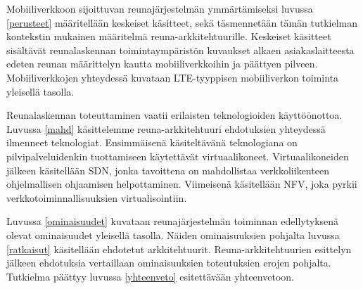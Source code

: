 Mobiiliverkkoon sijoittuvan reunajärjestelmän ymmärtämiseksi luvussa \ref{perusteet} määritellään keskeiset käsitteet, sekä täsmennetään tämän tutkielman kontekstin mukainen määritelmä reuna-arkkitehtuurille.
Keskeiset käsitteet sisältävät reunalaskennan toimintaympäristön kuvaukset alkaen asiakaslaitteesta edeten reunan määrittelyn kautta mobiiliverkkoihin ja päättyen pilveen.
Mobiiliverkkojen yhteydessä kuvataan LTE-tyyppisen mobiiliverkon toiminta yleisellä tasolla.

Reunalaskennan toteuttaminen vaatii erilaisten teknologioiden käyttöönottoa. Luvussa \ref{mahd} käsittelemme reuna-arkkitehtuuri ehdotuksien yhteydessä ilmenneet teknologiat. Ensimmäisenä käsiteltävänä teknologiana on pilvipalveluidenkin tuottamiseen käytettävät virtuaalikoneet.
Virtuaalikoneiden jälkeen käsitellään SDN, jonka tavoittena on mahdollistaa verkkoliikenteen ohjelmallisen ohjaamisen helpottaminen. 
Viimeisenä käsitellään NFV, joka pyrkii verkkotoiminnallisuuksien virtualisointiin.

 Luvussa \ref{ominaisuudet} kuvataan reunajärjestelmän toiminnan edellytyksenä olevat ominaisuudet yleisellä tasolla. 
Näiden ominaisuuksien pohjalta luvussa \ref{ratkaisut} käsitellään ehdotetut arkkitehtuurit. 
Reuna-arkkitehtuurien esittelyn jälkeen ehdotuksia vertaillaan ominaisuuksien toteutuksien erojen pohjalta.
Tutkielma päättyy luvussa \ref{yhteenveto} esitettävään yhteenvetoon.

